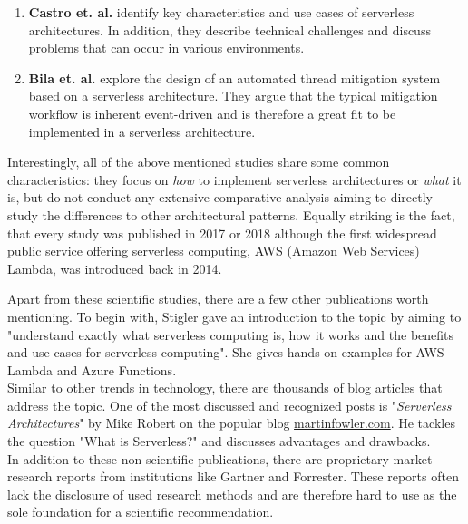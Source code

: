 \begin{enumerate}
    \item 
        \textbf{Castro et. al.} identify key characteristics and use cases of serverless architectures. In addition, they describe technical challenges and discuss problems that can occur in various environments.
    \item
        \textbf{Bila et. al.} explore the design of an automated thread mitigation system based on a serverless architecture. They argue that the typical mitigation workflow is inherent event-driven and is therefore a great fit to be implemented in a serverless architecture.  \autocite{Bila2017LeveragingContainers}
\end{enumerate}

Interestingly, all of the above mentioned studies share some common characteristics: they focus on \textit{how} to implement serverless architectures or \textit{what} it is, but do not conduct any extensive comparative analysis aiming to directly study the differences to other architectural patterns. Equally striking is the fact, that every study was published in 2017 or 2018 although the first widespread public service offering serverless computing, AWS (Amazon Web Services) Lambda, was introduced back in 2014.\autocite{Lindblom2014AWSBlog}

Apart from these scientific studies, there are a few other publications worth mentioning. To begin with, Stigler gave an introduction to the topic by aiming to "understand exactly what serverless computing is, how it works and the benefits and use cases for serverless computing". She gives hands-on examples for AWS Lambda and Azure Functions.\autocite{Stigler2018UnderstandingComputing}\\
Similar to other trends in technology, there are thousands of blog articles that address the topic. One of the most discussed and recognized posts is "\textit{Serverless Architectures}" by Mike Robert on the popular blog \url{martinfowler.com}\autocite{Roberts2016ServerlessArchitectures}. He tackles the question "What is Serverless?" and discusses advantages and drawbacks. \\
In addition to these non-scientific publications, there are proprietary market research reports from institutions like Gartner
\autocite{Smith2017Hype2017}\highcomma
\autocite{Weiss2017Hype2017}\highcomma
\autocite{Natis2017Hype2017}\highcomma
\autocite{Walker2017Hype2017}\highcomma
\autocite{DawsonPhilip2017Hype2017}
and Forrester\autocite{Hammond2018DemystifyingComputing}. These reports often lack the disclosure of used research methods and are therefore hard to use as the sole foundation for a scientific recommendation. 

